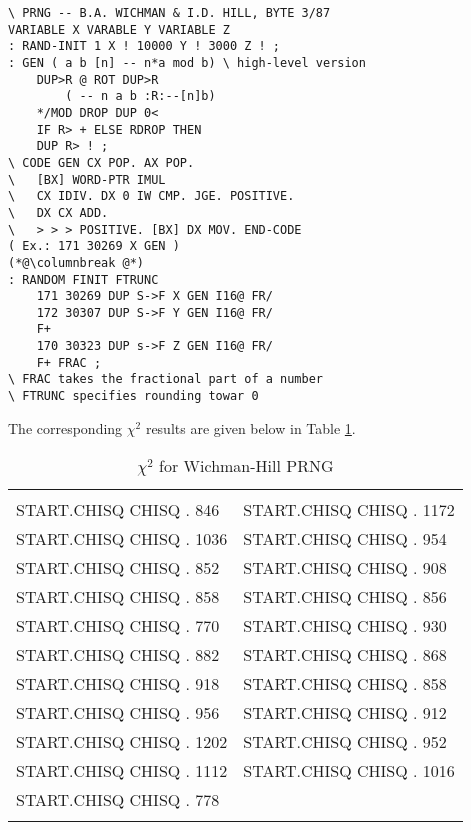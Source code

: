 \begin{multicols}{2}
\setlength{\columnsep}{1.5cm}
\setlength{\columnseprule}{0.2pt}
\tiny
\begin{lstlisting}
\ PRNG -- B.A. WICHMAN & I.D. HILL, BYTE 3/87
VARIABLE X VARABLE Y VARIABLE Z
: RAND-INIT 1 X ! 10000 Y ! 3000 Z ! ;
: GEN ( a b [n] -- n*a mod b) \ high-level version
    DUP>R @ ROT DUP>R
        ( -- n a b :R:--[n]b)
    */MOD DROP DUP 0<
    IF R> + ELSE RDROP THEN
    DUP R> ! ;
\ CODE GEN CX POP. AX POP.
\   [BX] WORD-PTR IMUL
\   CX IDIV. DX 0 IW CMP. JGE. POSITIVE.
\   DX CX ADD.
\   > > > POSITIVE. [BX] DX MOV. END-CODE
( Ex.: 171 30269 X GEN )
(*@\columnbreak @*)
: RANDOM FINIT FTRUNC
    171 30269 DUP S->F X GEN I16@ FR/
    172 30307 DUP S->F Y GEN I16@ FR/
    F+
    170 30323 DUP s->F Z GEN I16@ FR/
    F+ FRAC ;
\ FRAC takes the fractional part of a number 
\ FTRUNC specifies rounding towar 0
\end{lstlisting}
\end{multicols}
The corresponding $\chi^2$ results are given below in Table \ref{tbl:03_02}. %


\begin{table}
    \caption{$\chi^2$ for Wichman-Hill PRNG}
    \label{tbl:03_02}
        \setlength{\tabcolsep}{20pt}
        \begin{tabular}{|ll|}
            \hline & \\
            START.CHISQ CHISQ . 846   &  START.CHISQ CHISQ . 1172  \\ 
            START.CHISQ CHISQ . 1036  &  START.CHISQ CHISQ . 954   \\
            START.CHISQ CHISQ . 852   &  START.CHISQ CHISQ . 908   \\
            START.CHISQ CHISQ . 858   &  START.CHISQ CHISQ . 856   \\
            START.CHISQ CHISQ . 770   &  START.CHISQ CHISQ . 930   \\
            START.CHISQ CHISQ . 882   &  START.CHISQ CHISQ . 868   \\
            START.CHISQ CHISQ . 918   &  START.CHISQ CHISQ . 858   \\
            START.CHISQ CHISQ . 956   &  START.CHISQ CHISQ . 912   \\
            START.CHISQ CHISQ . 1202  &  START.CHISQ CHISQ . 952   \\
            START.CHISQ CHISQ . 1112  &  START.CHISQ CHISQ . 1016  \\
            START.CHISQ CHISQ . 778   & \\
            & \\
            \hline
        \end{tabular} 
\end{table}


